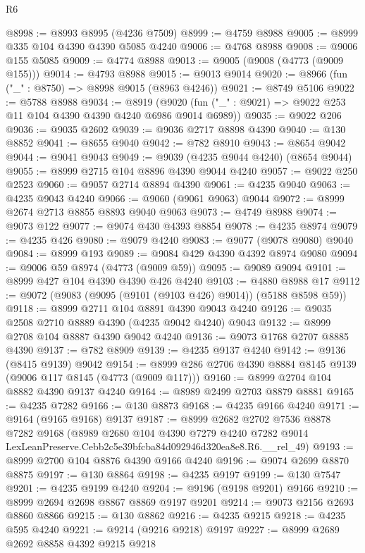 \begin{lexlean}{R6}
\begin{coremodule}
@8998 := @8993 @8995 (@4236 @7509)
@8999 := @4759 @8988
@9005 := @8999 @335 @104 @4390 @4390 @5085 @4240
@9006 := @4768 @8988
@9008 := @9006 @155 @5085
@9009 := @4774 @8988
@9013 := @9005 (@9008 (@4773 (@9009 @155)))
@9014 := @4793 @8988
@9015 := @9013 @9014
@9020 := @8966 (fun ("_" : @8750) => @8998 @9015 (@8963 @4246))
@9021 := @8749 @5106
@9022 := @5788 @8988
@9034 := @8919
    (@9020 (fun ("_" : @9021) => @9022 @253 @11 @104 @4390 @4390 @4240 @6986 @9014 @6989))
@9035 := @9022 @206
@9036 := @9035 @2602
@9039 := @9036 @2717 @8898 @4390
@9040 := @130 @8852
@9041 := @8655 @9040
@9042 := @782 @8910
@9043 := @8654 @9042
@9044 := @9041 @9043
@9049 := @9039 (@4235 @9044 @4240) (@8654 @9044)
@9055 := @8999 @2715 @104 @8896 @4390 @9044 @4240
@9057 := @9022 @250 @2523
@9060 := @9057 @2714 @8894 @4390
@9061 := @4235 @9040
@9063 := @4235 @9043 @4240
@9066 := @9060 (@9061 @9063) @9044
@9072 := @8999 @2674 @2713 @8855 @8893 @9040 @9063
@9073 := @4749 @8988
@9074 := @9073 @122
@9077 := @9074 @430 @4393 @8854
@9078 := @4235 @8974
@9079 := @4235 @426
@9080 := @9079 @4240
@9083 := @9077 (@9078 @9080) @9040
@9084 := @8999 @193
@9089 := @9084 @429 @4390 @4392 @8974 @9080
@9094 := @9006 @59 @8974 (@4773 (@9009 @59))
@9095 := @9089 @9094
@9101 := @8999 @427 @104 @4390 @4390 @426 @4240
@9103 := @4880 @8988 @17
@9112 := @9072 (@9083 (@9095 (@9101 (@9103 @426) @9014)) (@5188 @8598 @59))
@9118 := @8999 @2711 @104 @8891 @4390 @9043 @4240
@9126 := @9035 @2508 @2710 @8889 @4390 (@4235 @9042 @4240) @9043
@9132 := @8999 @2708 @104 @8887 @4390 @9042 @4240
@9136 := @9073 @1768 @2707 @8885 @4390
@9137 := @782 @8909
@9139 := @4235 @9137 @4240
@9142 := @9136 (@8415 @9139) @9042
@9154 := @8999 @286 @2706 @4390 @8884 @8145 @9139 (@9006 @117 @8145 (@4773 (@9009 @117)))
@9160 := @8999 @2704 @104 @8882 @4390 @9137 @4240
@9164 := @8989 @2499 @2703 @8879 @8881
@9165 := @4235 @7282
@9166 := @130 @8873
@9168 := @4235 @9166 @4240
@9171 := @9164 (@9165 @9168) @9137
@9187 := @8999
    @2682
    @2702
    @7536
    @8878
    @7282
    @9168
    (@8989
      @2680
      @104
      @4390
      @7279
      @4240
      @7282
      @9014
      LexLeanPreserve.Cebb2c5e39bfcba84d092946d320ea8e8.R6.__rel_49)
@9193 := @8999 @2700 @104 @8876 @4390 @9166 @4240
@9196 := @9074 @2699 @8870 @8875
@9197 := @130 @8864
@9198 := @4235 @9197
@9199 := @130 @7547
@9201 := @4235 @9199 @4240
@9204 := @9196 (@9198 @9201) @9166
@9210 := @8999 @2694 @2698 @8867 @8869 @9197 @9201
@9214 := @9073 @2156 @2693 @8860 @8866
@9215 := @130 @8862
@9216 := @4235 @9215
@9218 := @4235 @595 @4240
@9221 := @9214 (@9216 @9218) @9197
@9227 := @8999 @2689 @2692 @8858 @4392 @9215 @9218

\end{coremodule}
\end{lexlean}
